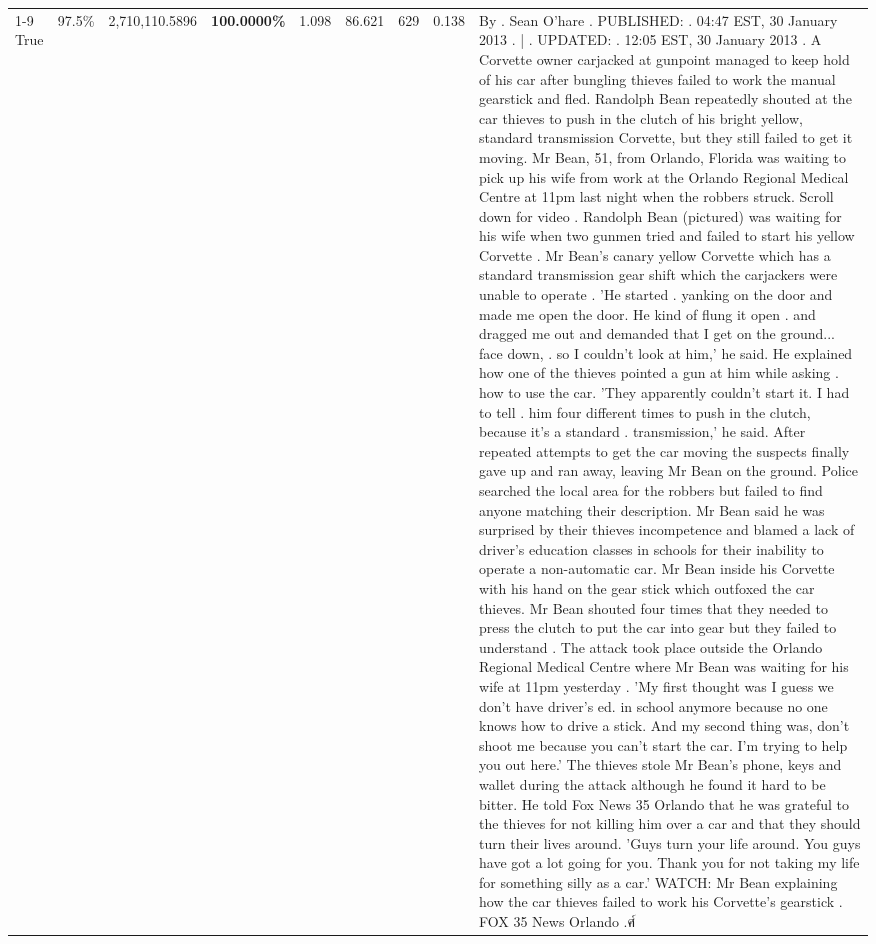 \begin{table}[H]
\begin{tabular}{lllrlllll}
\cline{1-9} \cline{2-9}
True & 97.5\% & 2,710,110.5896 & \bfseries \color{red} 100.0000\% & 1.098 & 86.621 & 629 & 0.138 & By . Sean O'hare . PUBLISHED: . 04:47 EST, 30 January 2013 . | . UPDATED: . 12:05 EST, 30 January 2013 . A Corvette owner carjacked at gunpoint managed to keep hold of his car after bungling thieves failed to work the manual gearstick and fled. Randolph Bean repeatedly shouted at the car thieves to push in the clutch of his bright yellow, standard transmission Corvette, but they still failed to get it moving. Mr Bean, 51, from Orlando, Florida was waiting to pick up his wife from work at the Orlando Regional Medical Centre at 11pm last night when the robbers struck. Scroll down for video . Randolph Bean (pictured) was waiting for his wife when two gunmen tried and failed to start his yellow Corvette . Mr Bean's canary yellow Corvette which has a standard transmission gear shift which the carjackers were unable to operate . 'He started . yanking on the door and made me open the door. He kind of flung it open . and dragged me out and demanded that I get on the ground... face down, . so I couldn't look at him,' he said. He explained how one of the thieves pointed a gun at him while asking . how to use the car. 'They apparently couldn't start it. I had to tell . him four different times to push in the clutch, because it's a standard . transmission,' he said. After repeated attempts to get the car moving the suspects finally gave up and ran away, leaving Mr Bean on the ground. Police searched the local area for the robbers but failed to find anyone matching their description. Mr Bean said he was surprised by their thieves incompetence and blamed a lack of driver's education classes in schools for their inability to operate a non-automatic car. Mr Bean inside his Corvette with his hand on the gear stick which outfoxed the car thieves. Mr Bean shouted four times that they needed to press the clutch to put the car into gear but they failed to understand . The attack took place outside the Orlando Regional Medical Centre where Mr Bean was waiting for his wife at 11pm yesterday . 'My first thought was I guess we don't have driver's ed. in school anymore because no one knows how to drive a stick. And my second thing was, don't shoot me because you can't start the car. I'm trying to help you out here.' The thieves stole Mr Bean's phone, keys and wallet during the attack although he found it hard to be bitter. He told Fox News 35 Orlando that he was grateful to the thieves for not killing him over a car and that they should turn their lives around. 'Guys turn your life around. You guys have got a lot going for you. Thank you for not taking my life for something silly as a car.' WATCH: Mr Bean explaining how the car thieves failed to work his Corvette's gearstick . FOX 35 News Orlando .ศ์ \\

\end{tabular}
\end{table}
